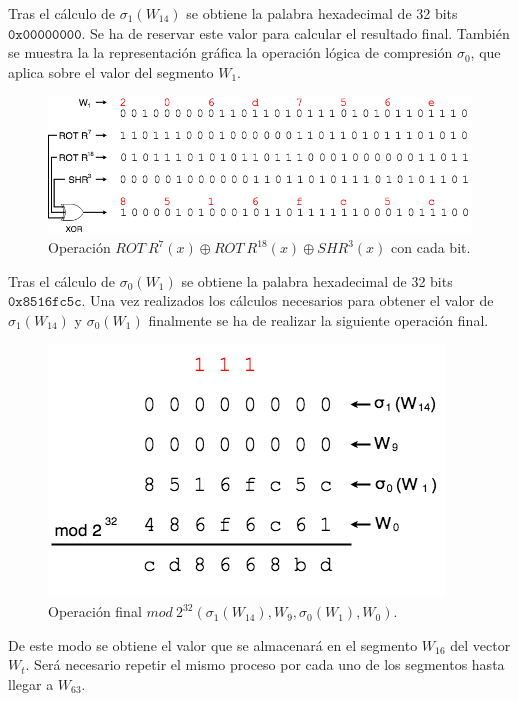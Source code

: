 \documentclass{article}
\begin{document}
        Tras el cálculo de $\sigma_{1}(W_{14})$ se obtiene la palabra hexadecimal de 32 bits $\texttt{0x00000000}$. Se ha de reservar este valor para calcular el resultado final. También se muestra la la representación gráfica la operación lógica de compresión $\sigma_{0}$, que aplica sobre el valor del segmento $W_{1}$.
        \begin{figure}[H]
        \centering
            \includegraphics[scale=0.445]{img/SHA-256-Wt_operation_sigma0.png}
            \caption{Operación $ROT \ R^{7}(x) \oplus ROT \ R^{18}(x) \oplus SHR^{3}(x)$ con cada bit.}
        \end{figure}
        
        Tras el cálculo de $\sigma_{0}(W_{1})$ se obtiene la palabra hexadecimal de 32 bits $\texttt{0x8516fc5c}$. Una vez realizados los cálculos necesarios para obtener el valor de $\sigma_{1}(W_{14})$ y $\sigma_{0}(W_{1})$ finalmente se ha de realizar la siguiente operación final.
        \begin{figure}[H]
        \centering
            \includegraphics[scale=0.445]{img/SHA-256-Wt_operation_mod2_32_final.png}
            \caption{Operación final $mod \ 2^{32} (\sigma_{1}(W_{14}), W_{9}, \sigma_{0}(W_{1}), W_{0})$.}
        \end{figure}
        
        De este modo se obtiene el valor que se almacenará en el segmento $W_{16}$ del vector $W_t$. Será necesario repetir el mismo proceso por cada uno de los segmentos hasta llegar a $W_{63}$.
        
\end{document}
